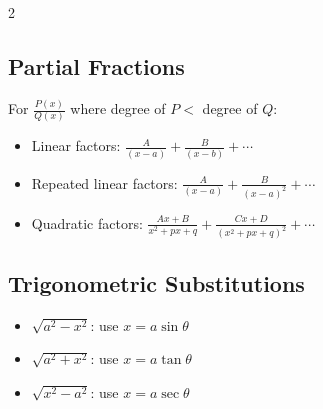 \begin{multicols}{2}
\subsection*{Partial Fractions}
For $\frac{P(x)}{Q(x)}$ where degree of $P < $ degree of $Q$:
\begin{itemize}
\item Linear factors: $\frac{A}{(x-a)} + \frac{B}{(x-b)} + \cdots$
\item Repeated linear factors: $\frac{A}{(x-a)} + \frac{B}{(x-a)^2} + \cdots$
\item Quadratic factors: $\frac{Ax+B}{x^2+px+q} + \frac{Cx+D}{(x^2+px+q)^2} + \cdots$
\end{itemize}

\subsection*{Trigonometric Substitutions}
\begin{itemize}
\item $\sqrt{a^2-x^2}$: use $x = a\sin\theta$
\item $\sqrt{a^2+x^2}$: use $x = a\tan\theta$
\item $\sqrt{x^2-a^2}$: use $x = a\sec\theta$
\end{itemize}
\end{multicols}

\newpage

